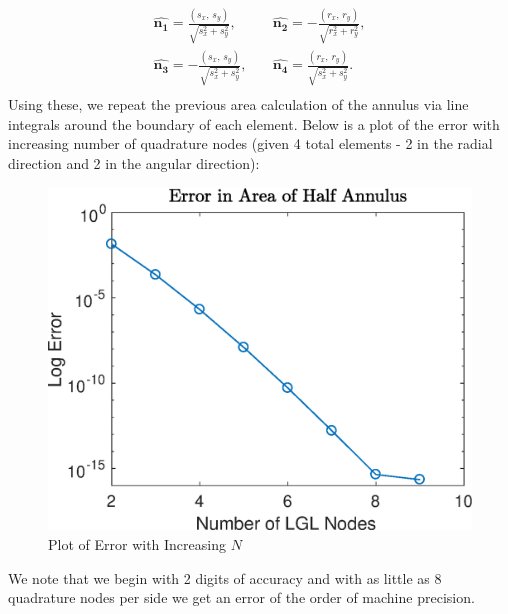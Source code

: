 \documentclass{article}
\begin{document}
  \begin{align*}
    \hat{\boldsymbol{n_1}} = \frac{(s_x, \, s_y)}{\sqrt{s_x^2 + s_y^2}}, & \quad
    \hat{\boldsymbol{n_2}} = -\frac{(r_x, \, r_y)}{\sqrt{r_x^2 + r_y^2}}, \\
    \hat{\boldsymbol{n_3}} = -\frac{(s_x, \, s_y)}{\sqrt{s_x^2 + s_y^2}}, & \quad
    \hat{\boldsymbol{n_4}} = \frac{(r_x, \, r_y)}{\sqrt{s_x^2 + s_y^2}}. \\
  \end{align*}
Using these, we repeat the previous area calculation of the annulus via line integrals around the boundary of each element. Below is a plot of the error with increasing number of quadrature nodes (given 4 total elements - 2 in the radial direction and 2 in the angular direction):

\begin{figure}[H]
  \centering
  \includegraphics[scale=0.7]{media/annulus_line.eps}
  \caption{Plot of Error with Increasing $N$}
  \label{fig:line_plot}
\end{figure}
\noindent We note that we begin with 2 digits of accuracy and with as little as 8 quadrature nodes per side we get an error of the order of machine precision.
\end{document}
